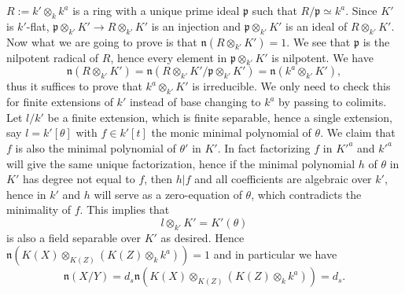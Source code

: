 \documentclass[letterpaper,reqno,12pt]{amsart}
\numberwithin{equation}{section}
\theoremstyle{plain}
\begin{document}
$R:=k'\otimes_k k^a$ is a ring with a unique prime ideal $\mathfrak p$ such that $R/\mathfrak p\simeq k^a$.  Since $K'$ is $k'$-flat, $\mathfrak p\otimes _{k'}K'\to R\otimes _{k'}K'$ is an injection and $\mathfrak p\otimes _{k'}K'$ is an ideal of $R\otimes _{k'}K'$. Now what we are going to prove is that $\mathfrak n(R\otimes_{k'}K')=1$. We see that $\mathfrak p$ is the nilpotent radical of $R$, hence every element in $\mathfrak p\otimes_{k'}K'$ is nilpotent. We have \[\mathfrak n(R\otimes_{k'}K')=\mathfrak n(R\otimes_{k'}K'/\mathfrak p\otimes_{k'}K')=\mathfrak n(k^a\otimes_{k'}K'),\] thus it suffices to prove that $k^a\otimes_{k'}K'$ is irreducible. We only need to check this for finite extensions of $k'$ instead of base changing to $k^a$ by passing to colimits. Let $l/k'$ be a finite extension, which is finite separable, hence a single extension, say $l=k'[\theta]$ with $f\in k'[t]$ the monic minimal polynomial of $\theta$. We claim that $f$ is also the minimal polynomial of $\theta'$ in $K'$. In fact factorizing $f$ in $K'^a$ and $k'^a$ will give the same unique factorization, hence if the minimal polynomial $h$ of $\theta$ in $K'$ has degree not equal to $f$, then $h|f$ and all coefficients are algebraic over $k'$, hence in $k'$ and $h$ will serve as a zero-equation of $\theta$, which contradicts the minimality of $f$. This implies that \[l\otimes_{k'} K'=K'(\theta)\] is also a field separable over $K'$ as desired. Hence $\mathfrak n(K(X)\otimes_{K(Z)}(K(Z)\otimes_kk^a))=1$ and in particular we have \[\mathfrak n(X/Y)=d_s\mathfrak n(K(X)\otimes_{K(Z)}(K(Z)\otimes_kk^a))=d_s.\] 
\end{document}
